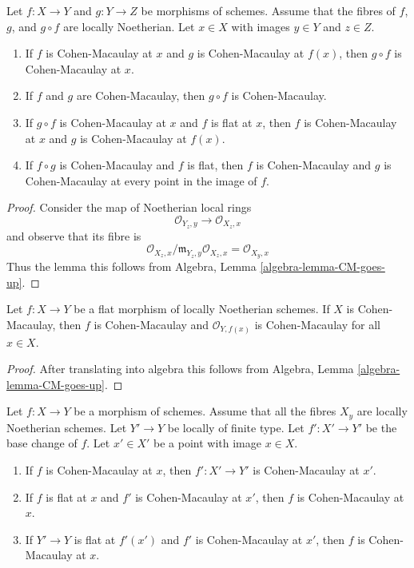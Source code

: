 \begin{lemma}
\label{lemma-composition-CM}
Let $f : X \to Y$ and $g : Y \to Z$ be morphisms of schemes. Assume that the
fibres of $f$, $g$, and $g \circ f$ are locally Noetherian.
Let $x \in X$ with images $y \in Y$ and $z \in Z$.
\begin{enumerate}
\item If $f$ is Cohen-Macaulay at $x$ and $g$ is Cohen-Macaulay
at $f(x)$, then $g \circ f$ is Cohen-Macaulay at $x$.
\item If $f$ and $g$ are Cohen-Macaulay, then $g \circ f$ is Cohen-Macaulay.
\item If $g \circ f$ is Cohen-Macaulay at $x$ and $f$ is flat at $x$,
then $f$ is Cohen-Macaulay at $x$ and $g$ is Cohen-Macaulay at $f(x)$.
\item If $f \circ g$ is Cohen-Macaulay and $f$ is flat, then
$f$ is Cohen-Macaulay and $g$ is Cohen-Macaulay at every point in
the image of $f$.
\end{enumerate}
\end{lemma}

\begin{proof}
Consider the map of Noetherian local rings
$$
\mathcal{O}_{Y_z, y} \to \mathcal{O}_{X_z, x}
$$
and observe that its fibre is
$$
\mathcal{O}_{X_z, x}/\mathfrak m_{Y_z, y}\mathcal{O}_{X_z, x} =
\mathcal{O}_{X_y, x}
$$
Thus the lemma this follows from
Algebra, Lemma \ref{algebra-lemma-CM-goes-up}.
\end{proof}

\begin{lemma}
\label{lemma-flat-morphism-from-CM-scheme}
Let $f : X \to Y$ be a flat morphism of locally Noetherian schemes.
If $X$ is Cohen-Macaulay, then $f$ is Cohen-Macaulay and
$\mathcal{O}_{Y, f(x)}$ is Cohen-Macaulay for all $x \in X$.
\end{lemma}

\begin{proof}
After translating into algebra this follows from
Algebra, Lemma \ref{algebra-lemma-CM-goes-up}.
\end{proof}

\begin{lemma}
\label{lemma-base-change-CM}
Let $f : X \to Y$ be a morphism of schemes.
Assume that all the fibres $X_y$ are locally Noetherian schemes.
Let $Y' \to Y$ be locally of finite type. Let $f' : X' \to Y'$
be the base change of $f$.
Let $x' \in X'$ be a point with image $x \in X$.
\begin{enumerate}
\item If $f$ is Cohen-Macaulay at $x$, then
$f' : X' \to Y'$ is Cohen-Macaulay at $x'$.
\item If $f$ is flat at $x$ and $f'$ is Cohen-Macaulay at $x'$, then $f$
is Cohen-Macaulay at $x$.
\item If $Y' \to Y$ is flat at $f'(x')$ and $f'$ is Cohen-Macaulay at
$x'$, then $f$ is Cohen-Macaulay at $x$.
\end{enumerate}
\end{lemma}

